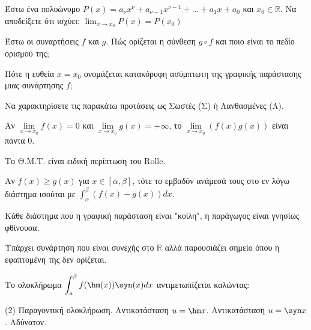 \documentclass[11pt,a4paper]{article}
\newcommand{\kerkissans}[1]{{\fontfamily{maksf}\selectfont \textbf{#1}}}
\renewcommand{\textdexiakeraia}{}
\newcommand{\dint}{\displaystyle\int}
\newcommand\themanum{A}
\newcounter{thema}[section]
\renewcommand{\thethema}{\arabic{thema}}
\newcommand{\Thema}{\refstepcounter{thema}{\textbf{\textcolor{black}{\faPenSquare\ \  \large \kerkissans{\textbf{\thethemaο\hspace{2mm}Διαγώνισμα - Θέμα \themanum}}}}}\hspace{0mm}}{}
\newenvironment{thema}[1]
{\begin{tcolorbox}[title=\Thema\kerkissans{\textbf{\large{  #1}}},breakable,
enhanced standard,titlerule=0pt,toprule=0pt, rightrule=0pt, bottomrule=0pt,
colback=white,left=0mm,top=1mm,bottom=0mm,
boxrule=0pt,
colframe=white,leftrule=0mm,sharp corners,coltitle=black]
\renewcommand{\themanum}{#1}}
{\end{tcolorbox}}
\newcommand{\eng}[1]{\selectlanguage{english}#1\selectlanguage{greek}}
\begin{document}
\begin{thema}{A}
\begin{erwthma}
    \item Έστω ένα πολυώνυμο $P(x) = a_\nu x^\nu + a_{\nu-1} x^{\nu-1} + \ldots + a_1 x + a_0$ και $ x_0 \in \mathbb{R} $. Να αποδείξετε ότι ισχύει: $ \lim_{x\to x_0} P(x) = P(x_0) $
    \item Έστω οι συναρτήσεις $f$ και $g$. Πώς ορίζεται η σύνθεση $g \circ f$ και ποιο είναι το πεδίο ορισμού της;
    \item Πότε η ευθεία $x=x_0$ ονομάζεται κατακόρυφη ασύμπτωτη της γραφικής παράστασης μιας συνάρτησης $f$;
    \item Να χαρακτηρίσετε τις παρακάτω προτάσεις ως Σωστές (Σ) ή Λανθασμένες (Λ).
    \begin{alist}
        \item Αν $\lim\limits_{x\to x_0} f(x) = 0$ και $\lim\limits_{x\to x_0} g(x) = +\infty$, το $\lim\limits_{x\to x_0} (f(x)g(x))$ είναι πάντα 0.
        \item Το Θ.Μ.Τ. είναι ειδική περίπτωση του \eng{Rolle}.
        \item Αν $f(x) \geq g(x)$ για $x \in [\alpha, \beta]$, τότε το εμβαδόν ανάμεσά τους στο εν λόγω διάστημα ισούται με $\dint_{\alpha}^{\beta} (f(x)-g(x)) dx$.
        \item Κάθε διάστημα που η γραφική παράσταση είναι "κοίλη", η παράγωγος είναι γνησίως φθίνουσα.
        \item Υπάρχει συνάρτηση που είναι συνεχής στο $\mathbb{R}$ αλλά παρουσιάζει σημείο όπου η εφαπτομένη της δεν ορίζεται.
    \end{alist}
    \item Το ολοκλήρωμα $\dint_{a}^{\beta} f(\hm(x)) \syn(x) dx$ αντιμετωπίζεται καλώντας:
    \begin{tasks}[label=\let\textdexiakeraia\relax\alph*.](2)
        \task Παραγοντική ολοκλήρωση.
        \task Αντικατάσταση $u = \hm x$.
        \task Αντικατάσταση $u = \syn x$.
        \task Αδύνατον.
    \end{tasks}
\end{erwthma}
\end{thema}
\vspace{1cm}
\end{document}
